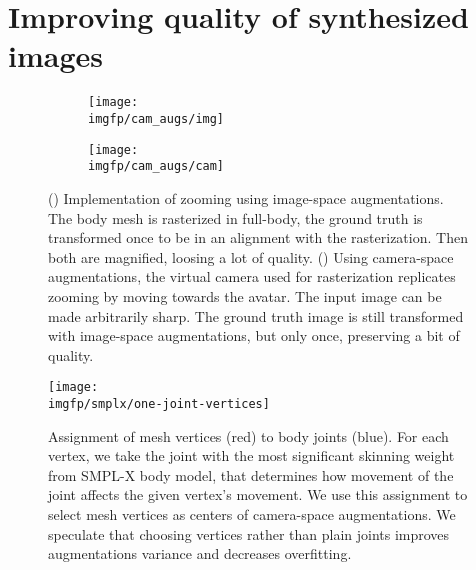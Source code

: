 \section{Improving quality of synthesized images}\label{methods:zooms}
\begin{figure}[ht]
	\centering
	\begin{subfigure}[b]{0.48\textwidth}
		\centering
		\texttt{[image: \\imgfp/cam\_augs/img]}%
		\caption{}
		\label{fig:cam_aug:before}
	\end{subfigure}
	\begin{subfigure}[b]{0.48\textwidth}
		\centering
		\texttt{[image: \\imgfp/cam\_augs/cam]}%
		\caption{}
		\label{fig:cam_aug:after}
	\end{subfigure}
	\caption{(\protect{}) Implementation of zooming using image-space augmentations. The body mesh is rasterized in full-body, the ground truth is transformed once to be in an alignment with the rasterization. Then both are magnified, loosing a lot of quality. (\protect{}) Using camera-space augmentations, the virtual camera used for rasterization replicates zooming by moving towards the avatar. The input image can be made arbitrarily sharp. The ground truth image is still transformed with image-space augmentations, but only once, preserving a bit of quality. }
	\label{fig:cam_aug}
\end{figure}

\begin{figure}[ht]
	\centering
		\texttt{[image: \\imgfp/smplx/one-joint-vertices]}%
	\caption{Assignment of mesh vertices (red) to body joints (blue). For each vertex, we take the joint with the most significant skinning weight from SMPL-X body model, that determines how movement of the joint affects the given vertex's movement. We use this assignment to select mesh vertices as centers of camera-space augmentations. We speculate that choosing vertices rather than plain joints improves augmentations variance and decreases overfitting.}
	\label{fig:smplx-vert2joint}
\end{figure}

